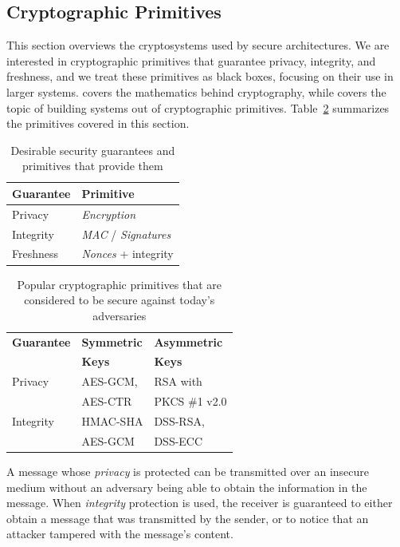 \subsection{Cryptographic Primitives}
\label{sec:crypto_primitives}

This section overviews the cryptosystems used by secure architectures. We are
interested in cryptographic primitives that guarantee privacy, integrity, and
freshness, and we treat these primitives as black boxes, focusing on their use
in larger systems. \cite{katz2014crypto} covers the mathematics behind
cryptography, while \cite{ferguson2011crypto} covers the topic of building
systems out of cryptographic primitives. Table~\ref{fig:crypto_primitives}
summarizes the primitives covered in this section.

\begin{table}[hbt]
  \centering
  \begin{tabular}{| l | l |}
  \hline
  \textbf{Guarantee} & \textbf{Primitive} \\
  \hline
  Privacy & \textit{Encryption} \\
  \hline
  Integrity & \textit{MAC} / \textit{Signatures} \\
  \hline
  Freshness & \textit{Nonces} + integrity \\
  \hline
  \end{tabular}
  \caption{
    Desirable security guarantees and primitives that provide them
  }
  \label{fig:crypto_primitives}
\end{table}

\begin{table}[hbt]
  \centering
  \begin{tabular}{| l | l | l |}
  \hline
  \textbf{Guarantee} & \textbf{Symmetric} & \textbf{Asymmetric} \\
                     & \textbf{Keys} & \textbf{Keys} \\
  \hline
  Privacy & AES-GCM, & RSA with \\
          & AES-CTR  & PKCS \#1 v2.0 \\
  \hline
  Integrity & HMAC-SHA & DSS-RSA, \\
            & AES-GCM & DSS-ECC \\
  \hline
  \end{tabular}
  \caption{
    Popular cryptographic primitives that are considered to be secure against
    today's adversaries
  }
  \label{fig:crypto_primitives}
\end{table}

A message whose \textit{privacy} is protected can be transmitted over an
insecure medium without an adversary being able to obtain the information in
the message. When \textit{integrity} protection is used, the receiver is
guaranteed to either obtain a message that was transmitted by the sender, or to
notice that an attacker tampered with the message's content.

